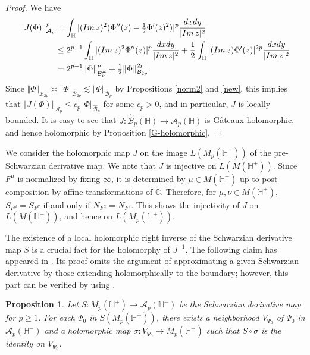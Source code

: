 \documentclass[amstex,12pt,reqno]{amsart}
\newtheorem{proposition}[theorem]{Proposition}
\theoremstyle{definition}
\begin{document}
\begin{proof}
We have
\begin{align}
\Vert J(\Phi) \Vert_{{\mathcal A}_p}^p
&=\int_{\mathbb H} |({\rm Im}\,z)^{2}(\Phi''(z)-\tfrac12\Phi'(z)^2)|^p\frac{dxdy}{|{\rm Im}\,z|^2}\\
&\leq 2^{p-1} \int_{\mathbb H} |({\rm Im}\,z)^{2}\Phi''(z)|^p\frac{dxdy}{|{\rm Im}\,z|^2}
+\frac12\int_{\mathbb H} |({\rm Im}\,z)\Phi'(z)|^{2p}\frac{dxdy}{|{\rm Im}\,z|^2}\\
&=2^{p-1}\Vert \Phi \Vert_{{\mathcal B}_p^{\#}}^p+\tfrac12\Vert \Phi \Vert_{{\mathcal B}_{2p}}^{2p}.
\end{align}
Since $\Vert \Phi \Vert_{{\mathcal B}_{2p}} \asymp \Vert \Phi \Vert_{\widehat{\mathcal B}_{2p}}
\lesssim \Vert \Phi \Vert_{\widehat{\mathcal B}_{p}}$ by Propositions \ref{norm2} and \ref{new}, this implies that 
$\Vert J(\Phi) \Vert_{{\mathcal A}_p} \leq c_p\Vert \Phi \Vert_{\widehat{\mathcal B}_p}$ for some
$c_p>0$, and in particular, $J$ is locally bounded.
It is easy to see that $J:\widehat{\mathcal B}_p(\mathbb H) \to {\mathcal A}_p(\mathbb H)$ is G\^{a}teaux holomorphic, 
and hence holomorphic by Proposition \ref{G-holomorphic}.
\end{proof}

We consider the holomorphic map $J$ on the image $L(M_p(\mathbb H^+))$ of the pre-Schwarzian derivative map.
We note that $J$ is injective on $L(M(\mathbb H^+))$. Since $F^\mu$ is normalized by
fixing $\infty$, it is determined by $\mu \in M(\mathbb H^+)$ up to post-composition by affine transformations of $\mathbb C$.
Therefore, 
for $\mu, \nu \in M(\mathbb H^+)$, $S_{F^{\mu}}=S_{F^{\nu}}$ if and only if $N_{F^{\mu}}=N_{F^{\nu}}$.
This shows the injectivity of $J$ on $L(M(\mathbb H^+))$, and hence on $L(M_p(\mathbb H^+))$.

The existence of a local holomorphic right inverse of the Schwarzian derivative map $S$ is
a crucial fact for the holomorphy of $J^{-1}$. 
The following claim has appeared in \cite[Theorem 4.1]{WM-1}.
Its proof omits the argument of approximating a given Schwarzian derivative 
by those extending holomorphically
to the boundary; however, this part can be verified by using \cite[Proposition 3]{Su}. 

\begin{proposition}\label{S-section}
Let $S:M_p(\mathbb H^+) \to {\mathcal A}_p(\mathbb H^-)$
be the Schwarzian derivative map for $p \geq 1$.
For each $\Psi_0$ in $S(M_p(\mathbb H^+))$, there exists a
neighborhood $V_{\Psi_0}$ of $\Psi_0$ in ${\mathcal A}_p(\mathbb H^-)$ 
and a holomorphic map $\sigma:V_{\Psi_0} \to M_p(\mathbb H^+)$ such that
$S \circ \sigma$ is the identity on $V_{\Psi_0}$.
\end{proposition}
\end{document}
